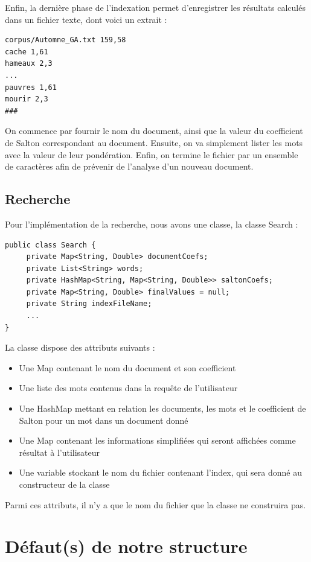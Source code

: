 \documentclass{article}
\begin{document}
Enfin, la dernière phase de l'indexation permet d'enregistrer les résultats calculés dans un
fichier texte, dont voici un extrait :

\begin{lstlisting}
corpus/Automne_GA.txt 159,58
cache 1,61
hameaux 2,3
...
pauvres 1,61
mourir 2,3
###
\end{lstlisting}

On commence par fournir le nom du document, ainsi que la valeur du coefficient de Salton
correspondant au document. Ensuite, on va simplement lister les mots avec la valeur de leur
pondération. Enfin, on termine le fichier par un ensemble de caractères afin de prévenir de
l'analyse d'un nouveau document.

\subsection{Recherche}

Pour l'implémentation de la recherche, nous avons une classe, la classe Search :

\begin{lstlisting}
public class Search {
     private Map<String, Double> documentCoefs;
     private List<String> words;
     private HashMap<String, Map<String, Double>> saltonCoefs;
     private Map<String, Double> finalValues = null;
     private String indexFileName;
     ...
}
\end{lstlisting}

La classe dispose des attributs suivants :
\begin{itemize}
  \item Une Map contenant le nom du document et son coefficient 
  \item Une liste des mots contenus dans la requête de l'utilisateur 
  \item Une HashMap mettant en relation les documents, les mots et le coefficient de Salton pour un mot dans un document donné
  \item Une Map contenant les informations simplifiées qui seront affichées comme résultat à l'utilisateur
  \item Une variable stockant le nom du fichier contenant l'index, qui sera donné au constructeur de la classe
\end{itemize}
Parmi ces attributs, il n'y a que le nom du fichier que la classe ne construira pas.

\section{Défaut(s) de notre structure}
\end{document}
